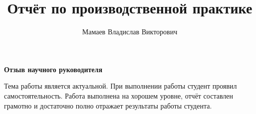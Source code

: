 \documentclass[%
bachelor,    %
subf,        %
href,        %
colorlinks,  %
]{disser}
\begin{document}
	
	
	
	
	
	\title{Отчёт по производственной практике}
	\def\topiclabel{}
	
	\author{Мамаев Владислав Викторович}
	
	
	
	\date{\number\year}
	
	\maketitle
	
	
	
	\begin{center}
		\textbf{Отзыв научного руководителя}
	\end{center}
	
	Тема работы является актуальной. При выполнении работы студент проявил самостоятельность. Работа выполнена на хорошем уровне, отчёт составлен грамотно и достаточно полно отражает результаты работы студента.
	
\end{document}
